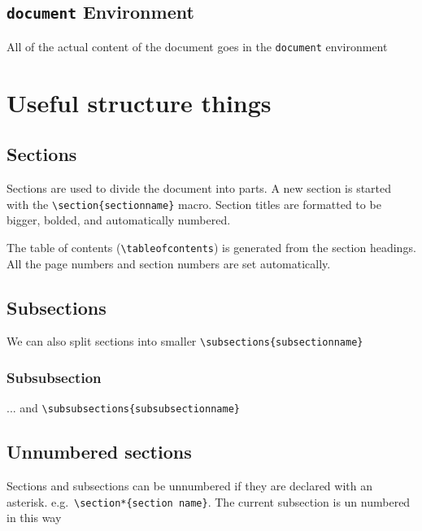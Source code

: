 \documentclass{article}
\begin{document}
\subsection{\lstinline{document} Environment}
All of the actual content of the document goes in the \lstinline{document} environment


\section{Useful structure things} %

\subsection{Sections}
Sections are used to divide the document into parts. A new section is started with the \lstinline|\section{sectionname}| macro. Section titles are formatted to be bigger, bolded, and automatically numbered.

The table of contents (\lstinline{\tableofcontents}) is generated from the section headings. All the page numbers and section numbers are set automatically.

\subsection{Subsections}
We can also split sections into smaller \lstinline|\subsections{subsectionname}|
\subsubsection{Subsubsection}
... and \lstinline|\subsubsections{subsubsectionname}|

\subsection*{Unnumbered sections}
Sections and subsections can be unnumbered if they are declared with an asterisk. e.g.\ \lstinline|\section*{section name}|. The current subsection is un numbered in this way

\end{document}
